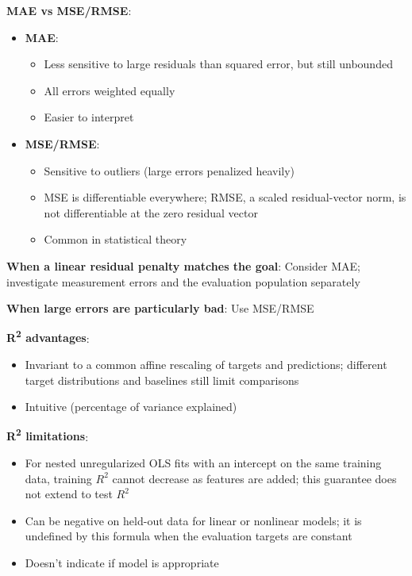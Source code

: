 \documentclass[11pt,twoside]{article}
\numberwithin{equation}{section}
\theoremstyle{plain}
\theoremstyle{definition}
\theoremstyle{remark}
\newenvironment{keyidea}{
  \begin{tcolorbox}[colback=yellow!5!white,
                    colframe=yellow!50!black,
                    title=Key Idea,
                    breakable,
                    enhanced,
                    sharp corners,
                    boxrule=0.8pt,
                    left=6pt, right=6pt, top=6pt, bottom=6pt]
}{
  \end{tcolorbox}
}
\begin{document}
\begin{keyidea}
\textbf{MAE vs MSE/RMSE}:
\begin{itemize}
\item \textbf{MAE}: 
  \begin{itemize}
  \item Less sensitive to large residuals than squared error, but still unbounded
  \item All errors weighted equally
  \item Easier to interpret
  \end{itemize}
\item \textbf{MSE/RMSE}:
  \begin{itemize}
  \item Sensitive to outliers (large errors penalized heavily)
  \item MSE is differentiable everywhere; RMSE, a scaled residual-vector norm, is not differentiable at the zero residual vector
  \item Common in statistical theory
  \end{itemize}
\end{itemize}

\textbf{When a linear residual penalty matches the goal}: Consider MAE; investigate measurement errors and the evaluation population separately

\textbf{When large errors are particularly bad}: Use MSE/RMSE

\textbf{R\textsuperscript{2} advantages}:
\begin{itemize}
\item Invariant to a common affine rescaling of targets and predictions; different target distributions and baselines still limit comparisons
\item Intuitive (percentage of variance explained)
\end{itemize}

\textbf{R\textsuperscript{2} limitations}:
\begin{itemize}
\item For nested unregularized OLS fits with an intercept on the same training data, training $R^2$ cannot decrease as features are added; this guarantee does not extend to test $R^2$
\item Can be negative on held-out data for linear or nonlinear models; it is undefined by this formula when the evaluation targets are constant
\item Doesn't indicate if model is appropriate
\end{itemize}
\end{keyidea}
\end{document}
